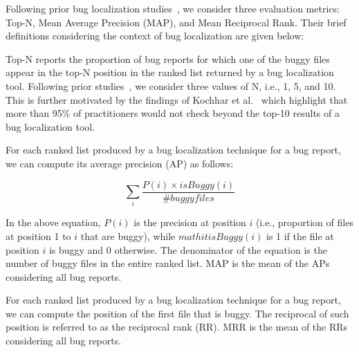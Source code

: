
Following prior bug localization studies~\cite{SahaLKP13,SahaLKP14,zhou2012should,huo2016learning}, we consider three evaluation metrics: Top-N, Mean Average Precision (MAP), and Mean Reciprocal Rank. Their brief definitions considering the context of bug localization are given below:

\vspace{0.2cm} Top-N reports the proportion of bug reports for which one of the buggy files appear in the top-N position in the ranked list returned by a bug localization tool. Following prior studies~\cite{SahaLKP13,SahaLKP14,zhou2012should,huo2016learning}, we consider three values of N, i.e., 1, 5, and 10. This is further motivated by the findings of Kochhar et al.~\cite{KochharXLL16} which highlight that more than 95\% of practitioners would not check beyond the top-10 results of a bug localization tool.

\vspace{0.2cm} For each ranked list produced by a bug localization technique for a bug report, we can compute its average precision (AP) as follows:

\begin{equation}
\sum_{i} \frac{P(i)\times isBuggy(i)}{\# buggy files}
\end{equation}

In the above equation, $\mathit{P(i)}$ is the precision at position $i$ (i.e., proportion of files at position 1 to $i$ that are buggy), while $mathit{isBuggy(i)}$ is 1 if the file at position $i$ is buggy and 0 otherwise. The denominator of the equation is the number of buggy files in the entire ranked list. MAP is the mean of the APs considering all bug reports.

\vspace{0.2cm} For each ranked list produced by a bug localization technique for a bug report, we can compute the position of the first file that is buggy. The reciprocal of such position is referred to as the reciprocal rank (RR). MRR is the mean of the RRs considering all bug reports.

